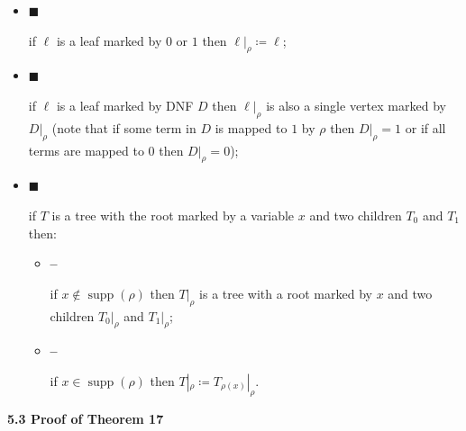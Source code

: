 \documentclass[10pt,a4paper]{article}
\begin{document}
\begin{itemize}


\item[] 
$\blacksquare$ 


if $\ell$ is a leaf marked by $0$ or $1$ then $\ell|_{\rho}\coloneqq\ell$;\par





\item[] 
$\blacksquare$ 


if $\ell$ is a leaf marked by DNF $D$ then $\ell|_{\rho}$ is also a single vertex marked by
$D|_{\rho}$ (note that if some term in $D$ is mapped to $1$ by $\rho$ then $D|_{\rho}=1$ or if all
terms are mapped to $0$ then $D|_{\rho}=0$);\par





\item[] 
$\blacksquare$ 


if $T$ is a tree with the root marked by a variable $x$ and two children $T_{0}$ and $T_{1}$ then:\par


\begin{itemize}


\item[] 
\textbf{–} 


if $x\notin\operatorname*{supp}(\rho)$ then $T|_{\rho}$ is a tree with a root marked by $x$ and two
children $T_{0}|_{\rho}$ and $T_{1}|_{\rho}$;\par





\item[] 
\textbf{–} 


if $x\in\operatorname*{supp}(\rho)$ then $T|_{\rho}\coloneqq T_{\rho(x)}|_{\rho}$.\par





\end{itemize}





\end{itemize}





\par\medskip\noindent\textbf{
5.3 Proof of Theorem 17
}\par
\end{document}
